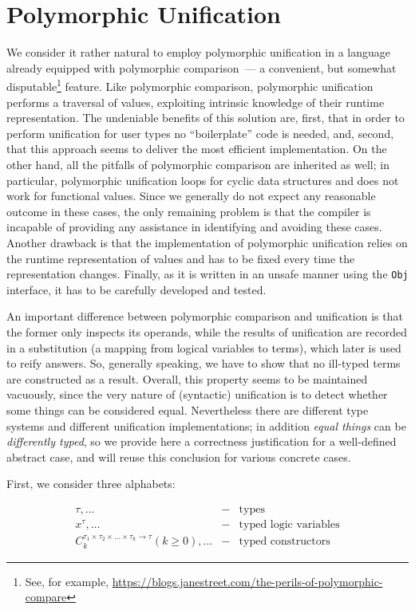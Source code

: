 \section{Polymorphic Unification}
\label{sec:unification}

We consider it rather natural to employ polymorphic unification in a language already equipped
with polymorphic comparison~--- a convenient, but somewhat disputable\footnote{See, for example,
\url{https://blogs.janestreet.com/the-perils-of-polymorphic-compare}} feature. Like polymorphic comparison,
polymorphic unification performs a traversal of values, exploiting intrinsic knowledge of their runtime
representation. The undeniable benefits of this solution are, first, that in order to perform unification
for user types no ``boilerplate'' code is needed, and, second, that this approach seems to deliver the
most efficient implementation. On the other hand, all the pitfalls of polymorphic comparison are inherited as
well; in particular, polymorphic unification loops for cyclic data structures and does not work for functional
values. Since we generally do not expect any reasonable outcome in these cases, the only remaining problem is that
the compiler is incapable of providing any assistance in identifying and avoiding these cases. Another drawback is that
the implementation of polymorphic unification relies on the runtime representation of values and has to be fixed
every time the representation changes.  Finally, as it is written in an unsafe manner using the \lstinline{Obj} interface,
it has to be carefully developed and tested.

An important difference between polymorphic comparison and unification is that the former only inspects its operands,
while the results of unification are recorded in a substitution (a mapping from logical variables to terms), which
later is used to reify answers. So, generally speaking, we have to show that no ill-typed
terms are constructed as a result. Overall, this property seems to be maintained vacuously, since the very
nature of (syntactic) unification is to detect whether some things can be considered equal. Nevertheless there are
different type systems and different unification implementations; in addition \emph{equal things} can be
\emph{differently typed}, so we provide here a correctness justification for a well-defined abstract case, and will
reuse this conclusion for various concrete cases.

First, we consider three alphabets:

$$
\begin{array}{rcl}
  \tau,\dots&-&\mbox{types}\\
  x^\tau,\dots&-&\mbox{typed logic variables}\\
  C_k^{\tau_1\times\tau_2\times\dots\times\tau_k\to\tau} (k\ge 0),\dots&-&\mbox{typed constructors}
\end{array}
$$

